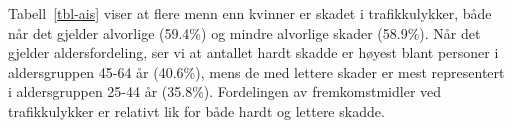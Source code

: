 \documentclass[
  letterpaper,
  DIV=11,
  numbers=noendperiod]{scrartcl}
\begin{document}
\endgroup

Tabell~\ref{tbl-ais} viser at flere menn enn kvinner er skadet i
trafikkulykker, både når det gjelder alvorlige (59.4\%) og mindre
alvorlige skader (58.9\%). Når det gjelder aldersfordeling, ser vi at
antallet hardt skadde er høyest blant personer i aldersgruppen 45-64 år
(40.6\%), mens de med lettere skader er mest representert i
aldersgruppen 25-44 år (35.8\%). Fordelingen av fremkomstmidler ved
trafikkulykker er relativt lik for både hardt og lettere skadde.
\end{document}
